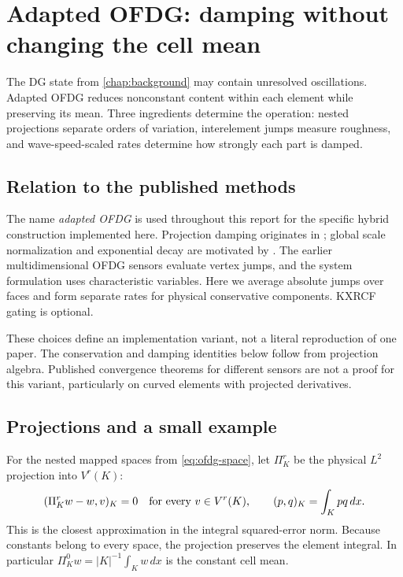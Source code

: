 \section{Adapted OFDG: damping without changing the cell mean}
\label{chap:ofdg}
The DG state from \cref{chap:background} may contain unresolved oscillations.
Adapted OFDG reduces nonconstant content within each element while preserving
its mean. Three ingredients determine the operation: nested projections separate
orders of variation, interelement jumps measure roughness, and wave-speed-scaled
rates determine how strongly each part is damped.

\subsection{Relation to the published methods}
\label{sec:ofdg-relation-to-literature}
The name \emph{adapted OFDG} is used throughout this report for the specific
hybrid construction implemented here. Projection damping originates in
\cite{LuEtAl2021,LiuEtAl2022}; global scale normalization and exponential decay
are motivated by \cite{PengEtAl2024}. The earlier multidimensional OFDG
sensors evaluate vertex jumps, and the system formulation uses characteristic
variables. Here we average absolute jumps over faces and form separate rates
for physical conservative components. KXRCF gating is optional.

These choices define an implementation variant, not a literal reproduction of
one paper. The conservation and damping identities below follow from projection
algebra. Published convergence theorems for different sensors are not a proof
for this variant, particularly on curved elements with projected derivatives.

\subsection{Projections and a small example}
\label{sec:ofdg-mathematics}
For the nested mapped spaces from \cref{eq:ofdg-space}, let $\Pi_K^r$ be the
physical $L^2$ projection into $V^r(K)$:
\begin{equation}
 (\Pi_K^r w-w,v)_K=0\quad\hbox{for every }v\in V^r(K),
 \qquad (p,q)_K=\int_K pq\,dx.
 \label{eq:ofdg-l2-projection}
\end{equation}
This is the closest approximation in the integral squared-error norm.
Because constants belong to every space, the projection preserves the element
integral. In particular $\Pi_K^0w=|K|^{-1}\int_Kw\,dx$ is the constant cell mean.

